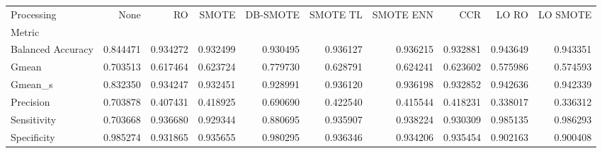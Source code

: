 \begin{tabular}{lrrrrrrrrr}
\toprule
Processing &      None &        RO &     SMOTE &  DB-SMOTE &  SMOTE TL &  SMOTE ENN &       CCR &     LO RO &  LO SMOTE \\
Metric            &           &           &           &           &           &            &           &           &           \\
\midrule
Balanced Accuracy &  0.844471 &  0.934272 &  0.932499 &  0.930495 &  0.936127 &   0.936215 &  0.932881 &  0.943649 &  0.943351 \\
Gmean             &  0.703513 &  0.617464 &  0.623724 &  0.779730 &  0.628791 &   0.624241 &  0.623602 &  0.575986 &  0.574593 \\
Gmean_s           &  0.832350 &  0.934247 &  0.932451 &  0.928991 &  0.936120 &   0.936198 &  0.932852 &  0.942636 &  0.942339 \\
Precision         &  0.703878 &  0.407431 &  0.418925 &  0.690690 &  0.422540 &   0.415544 &  0.418231 &  0.338017 &  0.336312 \\
Sensitivity       &  0.703668 &  0.936680 &  0.929344 &  0.880695 &  0.935907 &   0.938224 &  0.930309 &  0.985135 &  0.986293 \\
Specificity       &  0.985274 &  0.931865 &  0.935655 &  0.980295 &  0.936346 &   0.934206 &  0.935454 &  0.902163 &  0.900408 \\
\bottomrule
\end{tabular}
